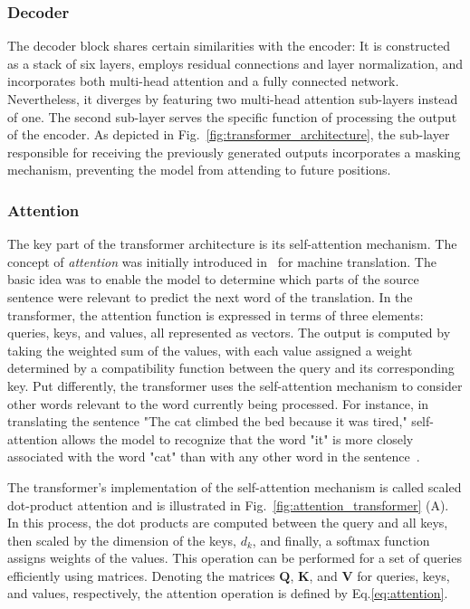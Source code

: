 \subsubsection{Decoder}

The decoder block shares certain similarities with the encoder: It is constructed as a stack of six layers, employs residual connections and layer normalization, and incorporates both multi-head attention and a fully connected network. Nevertheless, it diverges by featuring two multi-head attention sub-layers instead of one. The second sub-layer serves the specific function of processing the output of the encoder. As depicted in Fig.~\ref{fig:transformer_architecture}, the sub-layer responsible for receiving the previously generated outputs incorporates a masking mechanism, preventing the model from attending to future positions.

\subsubsection{Attention}

The key part of the transformer architecture is its self-attention mechanism. The concept of \textit{attention} was initially introduced in~\cite{bahdanau2014neural} for machine translation. The basic idea was to enable the model to determine which parts of the source sentence were relevant to predict the next word of the translation. In the transformer, the attention function is expressed in terms of three elements: queries, keys, and values, all represented as vectors. The output is computed by taking the weighted sum of the values, with each value assigned a weight determined by a compatibility function between the query and its corresponding key. Put differently, the transformer uses the self-attention mechanism to consider other words relevant to the word currently being processed. For instance, in translating the sentence "The cat climbed the bed because it was tired," self-attention allows the model to recognize that the word "it" is more closely associated with the word "cat" than with any other word in the sentence~\cite{jalammarIllustratedTransformer}.

The transformer's implementation of the self-attention mechanism is called scaled dot-product attention and is illustrated in Fig.~\ref{fig:attention_transformer} (A). In this process, the dot products are computed between the query and all keys, then scaled by the dimension of the keys, $d_k$, and finally, a softmax function assigns weights of the values. This operation can be performed for a set of queries efficiently using matrices. Denoting the matrices $\bm{Q}$, $\bm{K}$, and $\bm{V}$ for queries, keys, and values, respectively, the attention operation is defined by Eq.\eqref{eq:attention}.
 
